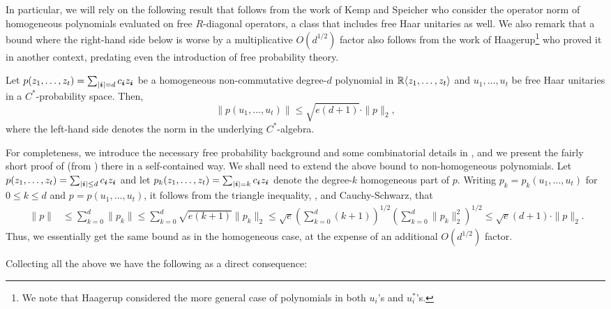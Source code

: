 In particular, we will rely on the following result that follows from the work of Kemp and Speicher \cite{KS05}  who consider the operator norm of homogeneous polynomials evaluated on free $R$-diagonal operators, a class that includes free Haar unitaries as well. We also remark that a bound where the right-hand side below is worse by a multiplicative $O(d^{1/2})$ factor also follows from the work of Haagerup\footnote{We note that Haagerup considered the more general case of polynomials in both $u_i$'s and $u^*_i$'s.}\cite{H78} who proved it in another context, predating even the introduction of free probability theory. 


\begin{theorem}[\cite{KS05}]
\label{thm:kemp-speicher}
    Let $p(z_1, \ldots, z_t) = \sum_{|{\boldsymbol{i}}| = d} c_{{\boldsymbol{i}}}z_{{\boldsymbol{i}}} $ be a homogeneous non-commutative degree-$d$ polynomial in ${\mathbb R}\langle z_1, \ldots, z_t\rangle$ and $u_1, \ldots, u_t$ be free Haar unitaries in a $C^*$-probability space. Then, 
    \[ 
    \|p(u_1, \ldots, u_t)\| \le \sqrt{e(d+1)} \cdot \|p\|_2,
    \]
    where the left-hand side denotes the norm in the underlying $C^*$-algebra. 
\end{theorem}

For completeness, we  introduce the necessary free probability background and some combinatorial details in , and we present the fairly short proof of  (from \cite{KS05}) there in a self-contained way. We shall need to extend the above bound to non-homogeneous polynomials. Let $p(z_1, \ldots, z_t) = \sum_{|{\boldsymbol{i}}| \le d} c_{{\boldsymbol{i}}}z_{{\boldsymbol{i}}}$ and  let $p_k(z_1, \ldots, z_t) = \sum_{|{\boldsymbol{i}}| = k} c_{{\boldsymbol{i}}}z_{{\boldsymbol{i}}}$ denote the degree-$k$ homogeneous part of $p$. Writing $p_k = p_k(u_1, \ldots, u_t)$ for $0 \le k  \le d$ and $p = p(u_1, \ldots, u_t)$, it follows from the triangle inequality,  , and Cauchy-Schwarz, that
    \begin{align*}
        \ \|p\| &\le \sum_{k=0}^d \|p_k\| 
        \le 
        \sum_{k=0}^d\sqrt{e(k+1)}\|p_k\|_2
        \le
       \sqrt{e}\left(\sum_{k=0}^d (k+1)\right)^{1/2} \left(\sum_{k=0}^d  \|p_k\|^2_2\right)^{1/2} \leq \sqrt{e}(d+1)  \cdot\|p\|_2.
    \end{align*}
Thus, we essentially get the same bound as in the homogeneous case, at the expense of an additional $O(d^{1/2})$ factor.



Collecting all the above we have the following as a direct consequence:

